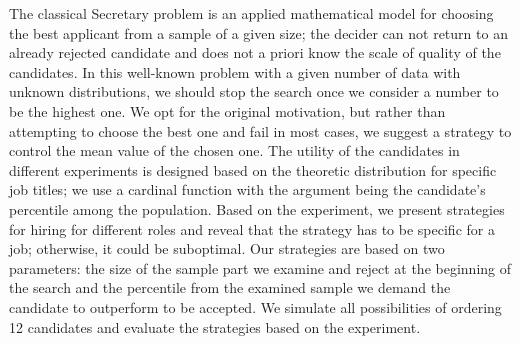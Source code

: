 
\begin{Abstrakt}
    The classical Secretary problem is an applied mathematical model for choosing the best applicant from a sample of a given size; the decider can not return to an already rejected candidate and does not a priori know the scale of quality of the candidates. In this well-known problem with a given number of data with unknown distributions, we should stop the search once we consider a number to be the highest one. We opt for the original motivation, but rather than attempting to choose the best one and fail in most cases, we suggest a strategy to control the mean value of the chosen one. The utility of the candidates in different experiments is designed based on the theoretic distribution for specific job titles; we use a cardinal function with the argument being the candidate's percentile among the population. Based on the experiment, we present strategies for hiring for different roles and reveal that the strategy has to be specific for a job; otherwise, it could be suboptimal. Our strategies are based on two parameters: the size of the sample part we examine and reject at the beginning of the search and the percentile from the examined sample we demand the candidate to outperform to be accepted. We simulate all possibilities of ordering 12 candidates and evaluate the strategies based on the experiment.
\end{Abstrakt}



\clearpage